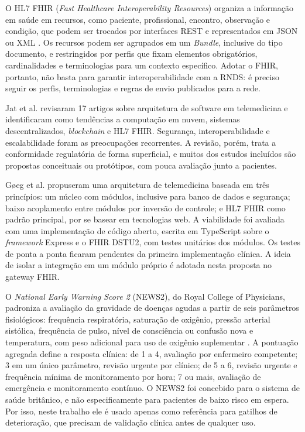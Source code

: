 
O HL7 FHIR (\textit{Fast Healthcare Interoperability Resources}) organiza a informação em saúde em recursos, como paciente, profissional, encontro, observação e condição, que podem ser trocados por interfaces REST e representados em JSON ou XML \cite{hl7fhirr4}. Os recursos podem ser agrupados em um \textit{Bundle}, inclusive do tipo documento, e restringidos por perfis que fixam elementos obrigatórios, cardinalidades e terminologias para um contexto específico. Adotar o FHIR, portanto, não basta para garantir interoperabilidade com a RNDS: é preciso seguir os perfis, terminologias e regras de envio publicados para a rede.


Jat et al. \cite{jat2024} revisaram 17 artigos sobre arquitetura de software em telemedicina e identificaram como tendências a computação em nuvem, sistemas descentralizados, \textit{blockchain} e HL7 FHIR. Segurança, interoperabilidade e escalabilidade foram as preocupações recorrentes. A revisão, porém, trata a conformidade regulatória de forma superficial, e muitos dos estudos incluídos são propostas conceituais ou protótipos, com pouca avaliação junto a pacientes.

Gøeg et al. \cite{goeg2018} propuseram uma arquitetura de telemedicina baseada em três princípios: um núcleo com módulos, inclusive para banco de dados e segurança; baixo acoplamento entre módulos por inversão de controle; e HL7 FHIR como padrão principal, por se basear em tecnologias web. A viabilidade foi avaliada com uma implementação de código aberto, escrita em TypeScript sobre o \textit{framework} Express e o FHIR DSTU2, com testes unitários dos módulos. Os testes de ponta a ponta ficaram pendentes da primeira implementação clínica. A ideia de isolar a integração em um módulo próprio é adotada nesta proposta no gateway FHIR.


O \textit{National Early Warning Score 2} (NEWS2), do Royal College of Physicians, padroniza a avaliação da gravidade de doenças agudas a partir de seis parâmetros fisiológicos: frequência respiratória, saturação de oxigênio, pressão arterial sistólica, frequência de pulso, nível de consciência ou confusão nova e temperatura, com peso adicional para uso de oxigênio suplementar \cite{rcp2017news2}. A pontuação agregada define a resposta clínica: de 1 a 4, avaliação por enfermeiro competente; 3 em um único parâmetro, revisão urgente por clínico; de 5 a 6, revisão urgente e frequência mínima de monitoramento por hora; 7 ou mais, avaliação de emergência e monitoramento contínuo. O NEWS2 foi concebido para o sistema de saúde britânico, e não especificamente para pacientes de baixo risco em espera. Por isso, neste trabalho ele é usado apenas como referência para gatilhos de deterioração, que precisam de validação clínica antes de qualquer uso.

